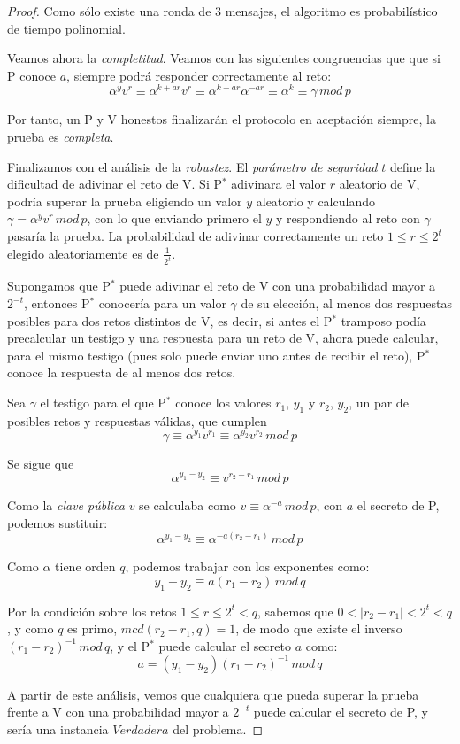 \begin{proof}
	Como sólo existe una ronda de 3 mensajes, el algoritmo es probabilístico de tiempo polinomial.
	
	
	Veamos ahora la \textit{completitud}. Veamos con las siguientes congruencias que que si P conoce $a$, siempre podrá responder correctamente al reto:
	\[
	\alpha^y v^r \equiv \alpha ^{k+ar} v^r \equiv \alpha^{k+ar} \alpha ^{-a r} \equiv \alpha ^k \equiv \gamma \, mod \, p
	\]
	
	Por tanto, un P y V honestos finalizarán el protocolo en aceptación siempre, la prueba es \textit{completa}.
	
	Finalizamos con el análisis de la \textit{robustez}. El \textit{parámetro de seguridad} $t$ define la dificultad de adivinar el reto de V. Si P$^*$ adivinara el valor $r$ aleatorio de V, podría superar la prueba eligiendo un valor $y$ aleatorio y calculando $\gamma = \alpha ^y v ^r \, mod \, p$, con lo que enviando primero el $y$ y respondiendo al reto con $\gamma$ pasaría la prueba. La probabilidad de adivinar correctamente un reto $1\leq r\leq 2^t$ elegido aleatoriamente es de $\frac{1}{2^t}$.
	
	
	Supongamos que P$^*$ puede adivinar el reto de V con una probabilidad mayor a $2^{-t}$, entonces P$^*$ conocería para un valor $\gamma$ de su elección, al menos dos respuestas posibles para dos retos distintos de V, es decir, si antes el P$^*$ tramposo podía precalcular un testigo y una respuesta para un reto de V, ahora puede calcular, para el mismo testigo (pues solo puede enviar uno antes de recibir el reto), P$^*$ conoce la respuesta de al menos dos retos.
	
	Sea $\gamma$ el testigo para el que P$^*$ conoce los valores $r_1$, $y_1$ y $r_2$, $y_2$, un par de posibles retos y respuestas válidas, que cumplen
	\[
	\gamma \equiv \alpha^{y_1} v^{r_1} \equiv \alpha^{y_2} v^{r_2} \, mod \, p
	\]
	
	Se sigue que
	\[
	\alpha^{y_1 - y_2} \equiv v ^{r_2 - r_1}  \, mod \, p
	\]
	
	Como la \textit{clave pública} $v$ se calculaba como $v\equiv \alpha^{-a} \, mod \, p$, con $a$ el secreto de P, podemos sustituir:
	\[
	\alpha^{y_1 - y_2} \equiv \alpha ^{-a(r_2 - r_1)}  \, mod \, p
	\]
	
	Como $\alpha$ tiene orden $q$, podemos trabajar con los exponentes como:
	\[
	y_1 - y_2 \equiv a(r_1 - r_2) \, mod \, q
	\]
	
	Por la condición sobre los retos $1\leq r \leq 2^t < q$, sabemos que $0 < \mid r_2 - r_1 \mid < 2^t < q$, y como $q$ es primo, $mcd(r_2-r_1,q)=1$, de modo que existe el inverso $(r_1 - r_2)^{-1} \, mod \, q$, y el P$^*$ puede calcular el secreto $a$ como:
	\[
	a = (y_1-y_2)(r_1-r_2)^{-1}\, mod \, q
	\]
	
	A partir de este análisis, vemos que cualquiera que pueda superar la prueba frente a V con una probabilidad mayor a $2^{-t}$ puede calcular el secreto de P, y sería una instancia $Verdadera$ del problema.
	
	
	
\end{proof}





